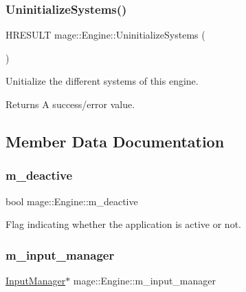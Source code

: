 \subsubsection{\texorpdfstring{Uninitialize\+Systems()}{UninitializeSystems()}}
{\footnotesize\ttfamily H\+R\+E\+S\+U\+LT mage\+::\+Engine\+::\+Uninitialize\+Systems (\begin{DoxyParamCaption}{ }\end{DoxyParamCaption})\hspace{0.3cm}{\ttfamily [protected]}}

Unitialize the different systems of this engine.

\begin{DoxyReturn}{Returns}
A success/error value. 
\end{DoxyReturn}


\subsection{Member Data Documentation}
\hypertarget{classmage_1_1_engine_ab8a4b0157403708ae7d1d018a95b4c63}{}\label{classmage_1_1_engine_ab8a4b0157403708ae7d1d018a95b4c63} 
\subsubsection{\texorpdfstring{m\+\_\+deactive}{m\_deactive}}
{\footnotesize\ttfamily bool mage\+::\+Engine\+::m\+\_\+deactive\hspace{0.3cm}{\ttfamily [private]}}

Flag indicating whether the application is active or not. \hypertarget{classmage_1_1_engine_a17aec067a1337c567c5cb1959c668da6}{}\label{classmage_1_1_engine_a17aec067a1337c567c5cb1959c668da6} 
\subsubsection{\texorpdfstring{m\+\_\+input\+\_\+manager}{m\_input\_manager}}
{\footnotesize\ttfamily \hyperlink{classmage_1_1_input_manager}{Input\+Manager}$\ast$ mage\+::\+Engine\+::m\+\_\+input\+\_\+manager\hspace{0.3cm}{\ttfamily [private]}}

